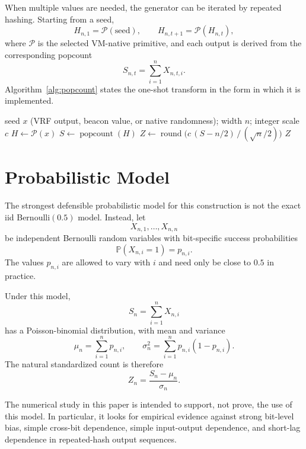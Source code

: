\documentclass[11pt]{article}
\begin{document}
When multiple values are needed, the generator can be iterated by repeated
hashing. Starting from a seed,
\[
H_{n,1} = \mathcal{P}(\text{seed}),
\qquad
H_{n,t+1} = \mathcal{P}(H_{n,t}),
\]
where $\mathcal{P}$ is the selected VM-native primitive, and each output is
derived from the corresponding popcount
\[
S_{n,t} = \sum_{i=1}^{n} X_{n,t,i}.
\]
Algorithm~\ref{alg:popcount} states the one-shot transform in the form in
which it is implemented.

\begin{algorithm}[htbp]
\caption{Popcount Gaussianization of a VM-native output}
\label{alg:popcount}
\begin{algorithmic}[1]
\Require seed $x$ (VRF output, beacon value, or native randomness); width $n$; integer scale $c$
\State $H \gets \mathcal{P}(x)$ 
\State $S \gets \operatorname{popcount}(H)$ 
\State $Z \gets \operatorname{round}\bigl(c\,(S - n/2)\,/\,(\sqrt{n}/2)\bigr)$ 
\State \Return $Z$ 
\end{algorithmic}
\end{algorithm}

\section{Probabilistic Model}

The strongest defensible probabilistic model for this construction is not the
exact iid Bernoulli$(0.5)$ model. Instead, let
\[
X_{n,1}, \dots, X_{n,n}
\]
be independent Bernoulli random variables with bit-specific success
probabilities
\[
\mathbb{P}(X_{n,i}=1)=p_{n,i}.
\]
The values $p_{n,i}$ are allowed to vary with $i$ and need only be close to
$0.5$ in practice.

Under this model,
\[
S_n = \sum_{i=1}^n X_{n,i}
\]
has a Poisson-binomial distribution, with mean and variance
\[
\mu_n = \sum_{i=1}^n p_{n,i},
\qquad
\sigma_n^2 = \sum_{i=1}^n p_{n,i}(1-p_{n,i}).
\]
The natural standardized count is therefore
\[
Z_n = \frac{S_n - \mu_n}{\sigma_n}.
\]

The numerical study in this paper is intended to support, not prove, the use of
this model. In particular, it looks for empirical evidence against strong
bit-level bias, simple cross-bit dependence, simple input-output dependence, and
short-lag dependence in repeated-hash output sequences.
\end{document}

